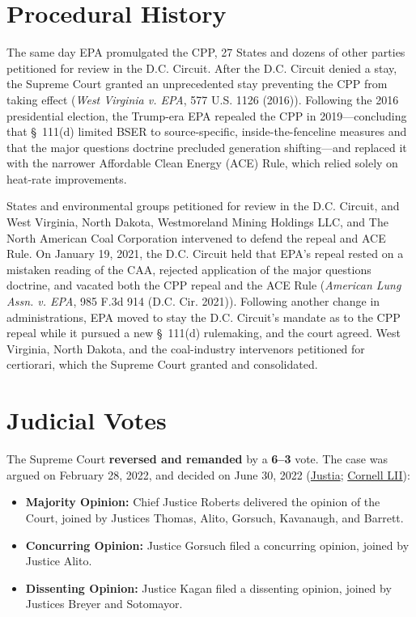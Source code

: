 \documentclass[12pt]{article}
\begin{document}
\section{Procedural History}
The same day EPA promulgated the CPP, 27 States and dozens of other parties petitioned for review in the D.C. Circuit. After the D.C. Circuit denied a stay, the Supreme Court granted an unprecedented stay preventing the CPP from taking effect (\textit{West Virginia v. EPA}, 577 U.S. 1126 (2016)). Following the 2016 presidential election, the Trump-era EPA repealed the CPP in 2019---concluding that \S~111(d) limited BSER to source-specific, inside-the-fenceline measures and that the major questions doctrine precluded generation shifting---and replaced it with the narrower Affordable Clean Energy (ACE) Rule, which relied solely on heat-rate improvements.

States and environmental groups petitioned for review in the D.C. Circuit, and West Virginia, North Dakota, Westmoreland Mining Holdings LLC, and The North American Coal Corporation intervened to defend the repeal and ACE Rule. On January 19, 2021, the D.C. Circuit held that EPA's repeal rested on a mistaken reading of the CAA, rejected application of the major questions doctrine, and vacated both the CPP repeal and the ACE Rule (\textit{American Lung Assn. v. EPA}, 985 F.3d 914 (D.C. Cir. 2021)). Following another change in administrations, EPA moved to stay the D.C. Circuit's mandate as to the CPP repeal while it pursued a new \S~111(d) rulemaking, and the court agreed. West Virginia, North Dakota, and the coal-industry intervenors petitioned for certiorari, which the Supreme Court granted and consolidated.

\section{Judicial Votes}
The Supreme Court \textbf{reversed and remanded} by a \textbf{6--3} vote. The case was argued on February 28, 2022, and decided on June 30, 2022 (\href{https://supreme.justia.com/cases/federal/us/597/20-1530/}{Justia}; \href{https://www.law.cornell.edu/supremecourt/text/20-1530}{Cornell LII}):

\begin{itemize}
    \item \textbf{Majority Opinion:} Chief Justice Roberts delivered the opinion of the Court, joined by Justices Thomas, Alito, Gorsuch, Kavanaugh, and Barrett.
    \item \textbf{Concurring Opinion:} Justice Gorsuch filed a concurring opinion, joined by Justice Alito.
    \item \textbf{Dissenting Opinion:} Justice Kagan filed a dissenting opinion, joined by Justices Breyer and Sotomayor.
\end{itemize}
\end{document}
